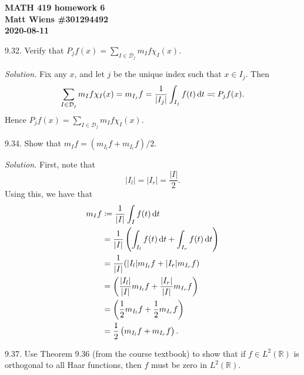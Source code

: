 \documentclass{article}
\newcommand{\R}{\mathbb{R}}
\newcommand{\D}{\mathcal{D}}
\begin{document}
\textbf{MATH 419 homework 6} \\
\textbf{Matt Wiens \#301294492} \\
\textbf{2020-08-11}

9.32. Verify that $P_j f(x) = \sum_{I \in \D_j} m_I f \chi_I (x)$.

\textit{Solution.}
Fix any $x$, and let $j$ be the unique index such that $x \in I_j$.
Then
%
\begin{equation*}
    \sum_{I \in \D_j} m_I f \chi_I (x)
        = m_{I_j} f
        = \frac{1}{|I_j|} \int_{I_j} f(t) \dif t
        \eqqcolon P_j f(x)
        .
\end{equation*}
%
Hence $P_j f(x) = \sum_{I \in \D_j} m_I f \chi_I (x)$.

\newpage

9.34. Show that $m_I f = (m_{I_l} f + m_{I_r} f) / 2$.

\textit{Solution.}
First, note that
%
\begin{equation*}
    |I_l| = |I_r| = \frac{|I|}{2}
    .
\end{equation*}
%
Using this, we have that
%
\begin{align*}
    m_{I} f
        &\coloneqq \frac{1}{|I|} \int_{I} f(t) \dif t \\
        &= \frac{1}{|I|}
        \del{
        \int_{I_l} f(t) \dif t
        +
        \int_{I_r} f(t) \dif t
        } \\
        &= \frac{1}{|I|} (|I_l| m_{I_l} f + |I_r| m_{I_r} f) \\
        &= \del{\frac{|I_l|}{|I|} m_{I_l} f + \frac{|I_r|}{|I|} m_{I_r} f} \\
        &= \del{\frac{1}{2} m_{I_l} f + \frac{1}{2} m_{I_r} f} \\
        &= \frac{1}{2} \del{m_{I_l} f + m_{I_r} f}
        .
\end{align*}

\newpage

9.37. Use Theorem 9.36 (from the course textbook) to show that
if $f \in L^2(\R)$ is orthogonal to all Haar functions, then $f$
must be zero in $L^2(\R)$.
\end{document}
